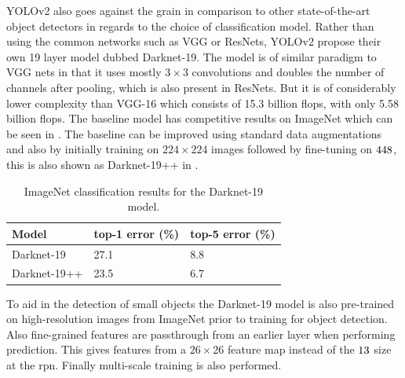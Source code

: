 YOLOv2 also goes against the grain in comparison to other state-of-the-art object detectors in regards to the choice of classification model. Rather than using the common networks such as VGG or ResNets, YOLOv2 propose their own 19 layer model dubbed Darknet-19. The model is of similar paradigm to VGG nets in that it uses mostly $3 \times 3$ convolutions and doubles the number of channels after pooling, which is also present in ResNets. But it is of considerably lower complexity than VGG-16 which consists of 15.3 billion \gls{flops}, with only 5.58 billion \gls{flops}. The baseline model has competitive results on ImageNet which can be seen in . The baseline can be improved using standard data augmentations and also by initially training on $224 \times 224$ images followed by fine-tuning on $448 \time 448$, this is also shown as Darknet-19++ in .

\begin{table}[h]
\centering
\caption{ImageNet classification results for the Darknet-19 model.}
\label{tab:darknetimagenet}
\begin{tabular}{|l|l|l|}
\hline
Model                                                                                       & top-1 error (\%) & top-5 error (\%) \\ \hline
Darknet-19                                                                                  & 27.1             & 8.8              \\ \hline
Darknet-19++ & 23.5             & 6.7              \\ \hline
\end{tabular}
\end{table}

To aid in the detection of small objects the Darknet-19 model is also pre-trained on high-resolution images from ImageNet prior to training for object detection. Also fine-grained features are passthrough from an earlier layer when performing prediction. This gives features from a $26 \times 26$ feature map instead of the $13 \time 13$ size at the \gls{rpn}. Finally multi-scale training is also performed.

